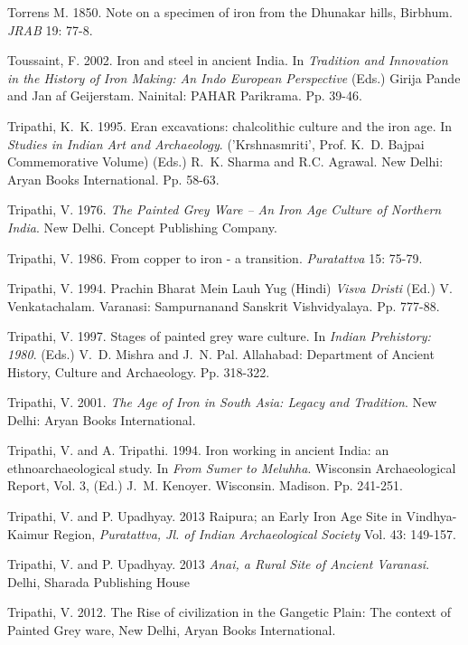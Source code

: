 \begin{thebibliography}{99}
 Torrens M. 1850. Note on a specimen of iron from the Dhunakar hills, Birbhum. \textit{JRAB} 19: 77-8.

 Toussaint, F. 2002. Iron and steel in ancient India. In \textit{Tradition and Innovation in the History of Iron Making: An Indo European Perspective} (Eds.) Girija Pande and Jan af Geijerstam. Nainital: PAHAR Parikrama. Pp. 39-46. 

 Tripathi, K.~K. 1995. Eran excavations: chalcolithic culture and the iron age. In \textit{Studies in Indian Art and Archaeology}. ('Krshnasmriti', Prof. K.~D. Bajpai Commemorative Volume) (Eds.) R.~K. Sharma and R.C. Agrawal. New Delhi: Aryan Books International. Pp. 58-63. 

 Tripathi, V. 1976. \textit{The Painted Grey Ware – An Iron Age Culture of Northern India}. New Delhi. Concept Publishing Company. 

 Tripathi, V. 1986. From copper to iron - a transition. \textit{Puratattva} 15: 75-79. 

 Tripathi, V. 1994. Prachin Bharat Mein Lauh Yug (Hindi) \textit{Visva Dristi} (Ed.) V. Venkatachalam. Varanasi: Sampurnanand Sanskrit Vishvidyalaya. Pp. 777-88.

 Tripathi, V. 1997. Stages of painted grey ware culture. In \textit{Indian Prehistory: 1980}. (Eds.) V.~D. Mishra and J.~N. Pal. Allahabad: Department of Ancient History, Culture and Archaeology. Pp. 318-322.

 Tripathi, V. 2001. \textit{The Age of Iron in South Asia: Legacy and Tradition}. New Delhi: Aryan Books International. 

 Tripathi, V. and A. Tripathi. 1994. Iron working in ancient India: an ethnoarchaeological study. In \textit{From Sumer to Meluhha}. Wisconsin Archaeological Report, Vol. 3, (Ed.) J.~M. Kenoyer. Wisconsin. Madison. Pp. 241-251.

 Tripathi, V. and P. Upadhyay. 2013 Raipura; an Early Iron Age Site in Vindhya-Kaimur Region, \textit{Puratattva, Jl. of Indian Archaeological Society} Vol. 43: 149-157.

 Tripathi, V. and P. Upadhyay. 2013 \textit{Anai, a Rural Site of Ancient Varanasi}. Delhi, Sharada Publishing House
 
 Tripathi, V. 2012. The Rise of civilization in the Gangetic Plain: The context of Painted Grey ware, New Delhi, Aryan Books International.


\end{thebibliography}
